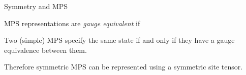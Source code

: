 \begin{frame}{Symmetry and MPS}

MPS representations are {\em gauge equivalent} if 
\begin{figure}
\centering

\end{figure}

\begin{theorem}
Two (simple) MPS specify the same state if and only if they have a gauge equivalence between them.
\end{theorem}
Therefore symmetric MPS can be represented using a symmetric site tensor.
\begin{figure}
\centering

\end{figure}

\end{frame}